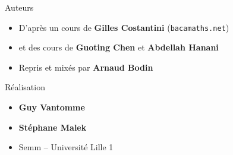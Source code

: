 \begin{frame}
\begin{minipage}{0.65\textwidth}
   \medskip
   
  Auteurs
  \begin{itemize}
  \item D'après un cours de {\bf Gilles Costantini} {(\texttt{bacamaths.net})}
  
  \item et des cours de {\bf Guoting Chen} et {\bf Abdellah Hanani}
  
  \item Repris et mixés par {\bf Arnaud Bodin} 
  \end{itemize}
  
  \medskip

  Réalisation
  \begin{itemize}
    \item {\bf Guy Vantomme}
    \item {\bf Stéphane Malek} 
    \item Semm -- Université Lille 1
  \end{itemize}

  \end{minipage}  



\end{frame}


